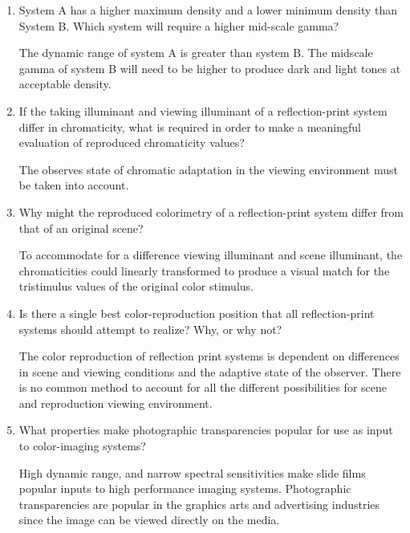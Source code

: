 \begin{enumerate}
\item  System A has a higher maximum density and a lower minimum
density than System B. Which system will require a higher
mid-scale gamma?
\newline
\par The dynamic range of system A is greater than system B.  The
midscale gamma of system B will need to be higher to produce dark
and light tones at acceptable density.

\item  If the taking illuminant and viewing illuminant of a
reflection-print system differ in chromaticity, what is required
in order to make a meaningful evaluation of reproduced
chromaticity values?
\newline
\par The observes state of chromatic adaptation in the viewing environment must be taken into
account.
\newline

\item  Why might the reproduced colorimetry of a reflection-print
system differ from that of an original scene?
\newline
\par To accommodate for a difference viewing
illuminant and scene illuminant, the chromaticities could linearly
transformed to produce a visual match for the tristimulus values
of the original color stimulus.
\newline

\item  Is there a single best color-reproduction position that all
reflection-print systems should attempt to realize? Why, or why
not?
\newline
\par  The color reproduction of reflection print systems is
dependent on differences in scene and viewing conditions and the
adaptive state of the observer.  There is no common method to
account for all the different possibilities for scene and
reproduction viewing environment.

\item What properties make photographic transparencies popular for
use as input to color-imaging systems?
\newline \par High dynamic range, and narrow spectral
sensitivities make slide films popular inputs to high performance
imaging systems.  Photographic transparencies are popular in the
graphics arts and advertising industries since the image can be
viewed directly on the media.
\newline


\end{enumerate}
